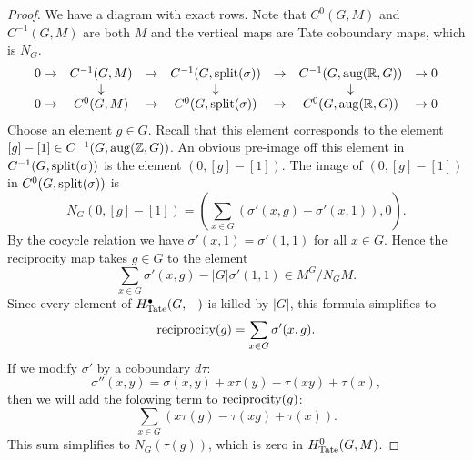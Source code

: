 \begin{proof}
	We have a diagram with exact rows.
	Note that $C^0(G,M)$ and $C^{-1}(G,M)$ are both $M$ and the vertical maps are Tate coboundary maps,
	which is $N_G$.
	\[
		\begin{matrix}
			0 \to & C^{-1}(G,M) & \to & C^{-1}(G,\mathrm{split}(\sigma)) & \to & C^{-1}(G,\mathrm{aug}({\mathbb R},G)) & \to 0 \\
			&\downarrow &&\downarrow &&\downarrow \\
			0 \to & C^{0}(G,M) & \to & C^{0}(G,\mathrm{split}(\sigma)) & \to & C^{0}(G,\mathrm{aug}({\mathbb R},G)) & \to 0
		\end{matrix}
	\]
	Choose an element $g \in G$. Recall that this element corresponds to the element
	$[g]-[1] \in C^{-1}(G,\mathrm{aug}({\mathbb Z},G))$.
	An obvious pre-image off this element in $C^{-1}(G,\mathrm{split}(\sigma))$ is
	the element $(0,[g]-[1])$.
	The image of $(0,[g]-[1])$ in $C^{0}(G,\mathrm{split}(\sigma))$ is
	\[
		N_G(0,[g]-[1])
		=
		(\sum_{x \in G} (\sigma'(x,g) - \sigma'(x,1)), 0).
	\]
	By the cocycle relation we have $\sigma'(x,1) = \sigma'(1,1)$ for all $x\in G$.
	Hence the reciprocity map takes $g \in G$ to the element
	\[
		\sum_{x \in G} \sigma'(x,g) - |G| \sigma'(1,1)
		\in M^G / N_G M.
	\]
	Since every element of $H^\bullet_{\mathrm{Tate}} (G,-)$ is killed by $|G|$, this formula simplifies to
	\[
		\mathrm{reciprocity} (g) = \sum_{x \in G} \sigma'(x,g).
	\]
	If we modify $\sigma'$ by a coboundary $d\tau$:
	\[
		\sigma''(x,y) = \sigma(x,y) + x \tau(y) - \tau(xy) + \tau(x),
	\]
	then we will add the folowing term to $\mathrm{reciprocity}(g)$:
	\[
		\sum_{x \in G} (x \tau(g) - \tau(xg) + \tau(x)).
	\]
	This sum simplifies to $N_G(\tau(g))$, which is zero in $H^0_{\mathrm{Tate}}(G,M)$.
\end{proof}
